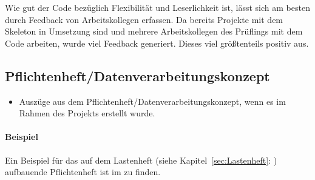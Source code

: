 Wie gut der Code bezüglich Flexibilität und Leserlichkeit ist, lässt sich am besten durch Feedback von Arbeitskollegen erfassen. Da bereits Projekte mit dem Skeleton in Umsetzung sind und mehrere Arbeitskollegen des Prüflings mit dem Code arbeiten, wurde viel Feedback generiert. Dieses viel größtenteils positiv aus.

\subsection{Pflichtenheft/Datenverarbeitungskonzept}
\label{sec:Pflichtenheft}
\begin{itemize}
	\item Auszüge aus dem Pflichtenheft/Datenverarbeitungskonzept, wenn es im Rahmen des Projekts erstellt wurde.
\end{itemize}

\paragraph{Beispiel}
Ein Beispiel für das auf dem Lastenheft (siehe Kapitel~\ref{sec:Lastenheft}: ) aufbauende Pflichtenheft ist im  zu finden.
